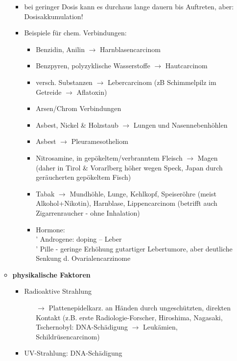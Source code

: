 \begin{itemize}
\begin{itemize}
\begin{itemize}
							\item bei geringer Dosis kann es durchaus lange dauern bis Auftreten, aber: Dosisakkumulation!
							\item Beispiele für chem. Verbindungen:
								\begin{itemize}
									\item Benzidin, Anilin $\rightarrow$ Harnblasencarcinom
									\item Benzpyren, polyzyklische Wasserstoffe $\rightarrow$ Hautcarcinom
									\item versch. Substanzen $\rightarrow$ Lebercarcinom
										(zB Schimmelpilz im Getreide $\rightarrow$ Aflatoxin) 
									\item Arsen/Chrom Verbindungen
									\item Asbest, Nickel \& Holzstaub $\rightarrow$ Lungen und Nasennebenhöhlen
									\item Asbest $\rightarrow$ Pleuramesotheliom
									\item Nitrosamine, in gepökeltem/verbranntem Fleisch $\rightarrow$ Magen\\
										(daher in Tirol \& Vorarlberg höher wegen Speck, Japan durch geräucherten gepökeltem Fisch)
									\item Tabak $\rightarrow$ Mundhöhle, Lunge, Kehlkopf, Speiseröhre (meist Alkohol+Nikotin), Harnblase, Lippencarcinom (betrifft auch Zigarrenraucher - ohne Inhalation)
									\item Hormone:\\
										' Androgene: doping – Leber\\
										' Pille - geringe Erhöhung gutartiger Lebertumore, aber deutliche Senkung d. Ovarialencarzinome
								\end{itemize}
						\end{itemize}
					\item \textbf{physikalische Faktoren}
						\begin{itemize}
							\item Radioaktive Strahlung
								\begin{itemize}
									\item[$\rightarrow$] Plattenepidelkarz. an Händen durch ungeschützten, direkten Kontakt (z.B. erste Radiologie-Forscher, Hiroshima, Nagasaki, Tschernobyl: DNA-Schädigung $\rightarrow$ Leukämien, Schildrüsencarcinom)
								\end{itemize}
							\item UV-Strahlung: DNA-Schädigung
								\begin{itemize}

\end{itemize}
\end{itemize}
\end{itemize}
\end{itemize}
